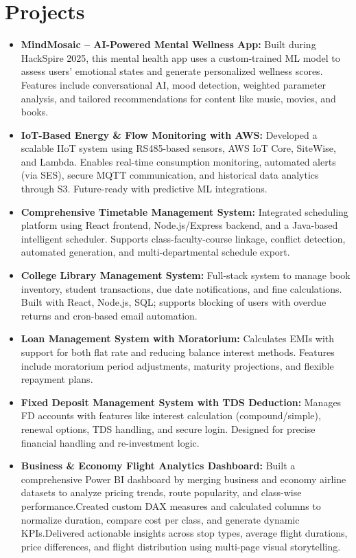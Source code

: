 \documentclass[10pt,a4paper]{article}
\begin{document}
\section*{Projects}

\begin{itemize}[leftmargin=*]
    \item \textbf{MindMosaic – AI-Powered Mental Wellness App:} Built during HackSpire 2025, this mental health app uses a custom-trained ML model to assess users' emotional states and generate personalized wellness scores. Features include conversational AI, mood detection, weighted parameter analysis, and tailored recommendations for content like music, movies, and books.

    \item \textbf{IoT-Based Energy \& Flow Monitoring with AWS:} Developed a scalable IIoT system using RS485-based sensors, AWS IoT Core, SiteWise, and Lambda. Enables real-time consumption monitoring, automated alerts (via SES), secure MQTT communication, and historical data analytics through S3. Future-ready with predictive ML integrations.

    \item \textbf{Comprehensive Timetable Management System:} Integrated scheduling platform using React frontend, Node.js/Express backend, and a Java-based intelligent scheduler. Supports class-faculty-course linkage, conflict detection, automated generation, and multi-departmental schedule export.

    \item \textbf{College Library Management System:} Full-stack system to manage book inventory, student transactions, due date notifications, and fine calculations. Built with React, Node.js, SQL; supports blocking of users with overdue returns and cron-based email automation.

    \item \textbf{Loan Management System with Moratorium:} Calculates EMIs with support for both flat rate and reducing balance interest methods. Features include moratorium period adjustments, maturity projections, and flexible repayment plans.

    \item \textbf{Fixed Deposit Management System with TDS Deduction:} Manages FD accounts with features like interest calculation (compound/simple), renewal options, TDS handling, and secure login. Designed for precise financial handling and re-investment logic.

    \item \textbf{Business & Economy Flight Analytics Dashboard:} Built a comprehensive Power BI dashboard by merging business and economy airline datasets to analyze pricing trends, route popularity, and class-wise performance.Created custom DAX measures and calculated columns to normalize duration, compare cost per class, and generate dynamic KPIs.Delivered actionable insights across stop types, average flight durations, price differences, and flight distribution using multi-page visual storytelling.


\end{itemize}
\end{document}
